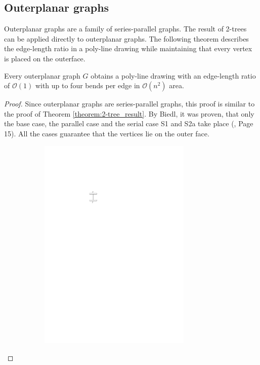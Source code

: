 \subsection{Outerplanar graphs}
Outerplanar graphs are a family of series-parallel graphs. The result of 2-trees can be applied directly to outerplanar graphs. The following theorem describes the edge-length ratio in a poly-line drawing while maintaining that every vertex is placed on the outerface.
\begin{theorem}
	Every outerplanar graph $G$ obtains a poly-line drawing with an edge-length ratio of $\mathcal{O}(1)$ with up to four bends per edge in $\mathcal{O}(n^2)$ area.
\end{theorem}
\begin{proof}
	Since outerplanar graphs are series-parallel graphs, this proof is similar to the proof of Theorem \ref{theorem:2-tree_result}. By Biedl, it was proven, that only the base case, the parallel case and the serial case S1 and S2a take place (\cite{DBLP:journals/dcg/Biedl11}, Page 15). All the cases guarantee that the vertices lie on the outer face.
	\begin{figure}[H]
		\centering
		\begin{subfigure}{0.8\linewidth}
			\centering
			\includegraphics[width=0.8\textwidth,page=14]{drawings/2-trees.pdf}

\end{subfigure}
\end{figure}
\end{proof}
